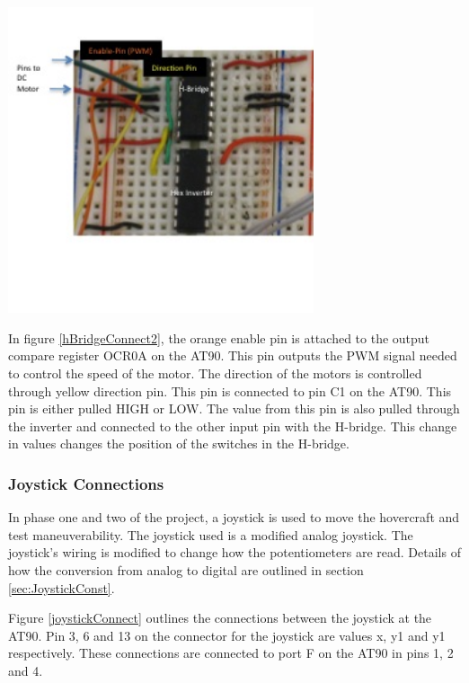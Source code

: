 \begin{minipage}{6.5in}
  \centering
    \includegraphics[width=90mm]{imageSources/hBridgeConnect2.png}
  
  \label{hBridgeConnect2}
\end{minipage}
\vspace{0.1in}

In figure \ref{hBridgeConnect2}, the orange enable pin is attached to the output compare register OCR0A on the AT90. This pin outputs the PWM signal needed to control the speed of the motor.  The direction of the motors is controlled through  yellow direction pin. This pin is connected to pin C1 on the AT90. This pin is either pulled HIGH or LOW. The value from this pin is also pulled through the inverter and connected to the other input pin with the H-bridge. This change in values changes the position of the switches in the H-bridge.

\subsubsection{Joystick Connections}

In phase one and two of the project, a joystick is used to move the hovercraft and test maneuverability. The joystick used is a modified analog joystick. The joystick's wiring is modified to change how the potentiometers are read. Details of how the conversion from analog to digital are outlined in section \ref{sec:JoystickConst}.


Figure \ref{joystickConnect} outlines the connections between the joystick at the AT90.  Pin 3, 6 and 13 on the connector for the joystick are values x, y1 and y1 respectively. These connections are connected to port F on the AT90 in pins 1, 2 and 4.


